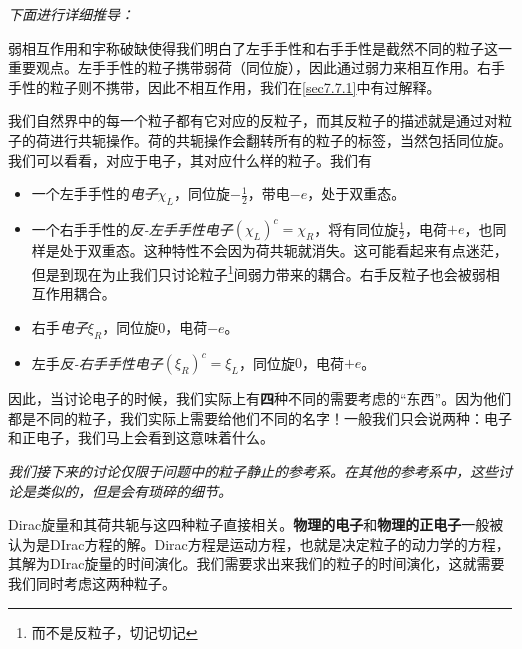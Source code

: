{\it 下面进行详细推导：}

弱相互作用和宇称破缺使得我们明白了左手手性和右手手性是截然不同的粒子这一重要观点。左手手性的粒子携带弱荷（同位旋），因此通过弱力来相互作用。右手手性的粒子则不携带，因此不相互作用，我们在\ref{sec7.7.1}中有过解释。

我们自然界中的每一个粒子都有它对应的反粒子，而其反粒子的描述就是通过对粒子的荷进行共轭操作。荷的共轭操作会翻转所有的粒子的标签，当然包括同位旋。我们可以看看，对应于电子，其对应什么样的粒子。我们有
\begin{itemize}
\item 一个左手手性的{\it 电子}$\chi_L$，同位旋$-\frac{1}{2}$，带电$-e$，处于双重态。
\item 一个右手手性的{\it 反-左手手性电子}$(\chi_L)^c=\chi_R$，将有同位旋$\frac{1}{2}$，电荷$+e$，也同样是处于双重态。这种特性不会因为荷共轭就消失。这可能看起来有点迷茫，但是到现在为止我们只讨论粒子\footnote{而不是反粒子，切记切记}间弱力带来的耦合。右手反粒子也会被弱相互作用耦合。
\item 右手{\it 电子}$\xi_R$，同位旋$0$，电荷$-e$。
\item 左手{\it 反-右手手性电子}$(\xi_R)^c=\xi_L$，同位旋$0$，电荷$+e$。
\end{itemize}

因此，当讨论电子的时候，我们实际上有{\bf 四}种不同的需要考虑的``东西''。因为他们都是不同的粒子，我们实际上需要给他们不同的名字！一般我们只会说两种：电子和正电子，我们马上会看到这意味着什么。

{\it 我们接下来的讨论仅限于问题中的粒子静止的参考系。在其他的参考系中，这些讨论是类似的，但是会有琐碎的细节。}

Dirac旋量和其荷共轭与这四种粒子直接相关。{\bf 物理的电子}和{\bf 物理的正电子}一般被认为是DIrac方程的解。Dirac方程是运动方程，也就是决定粒子的动力学的方程，其解为DIrac旋量的时间演化。我们需要求出来我们的粒子的时间演化，这就需要我们同时考虑这两种粒子。

